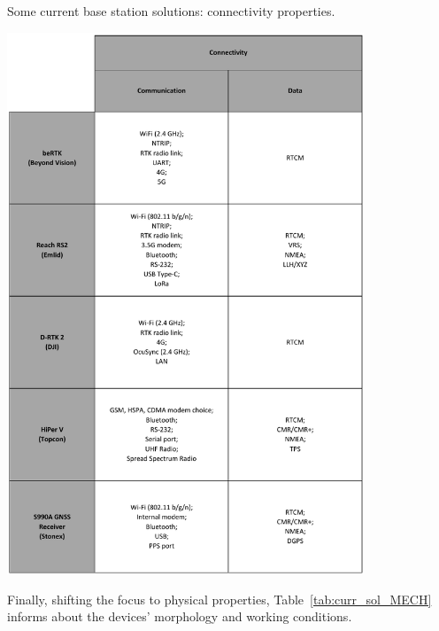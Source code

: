 \begingroup
\begin{table}[h]
    \centering
	\captionsetup{justification=centering}
    \caption{Some current base station solutions: connectivity properties.}
	\includegraphics[width=0.8\textwidth]{Chapters/Figures/curr_solutions/CONNECTIONS_v2.pdf}
	\label{tab:curr_sol_CONNECTIONS}
\end{table}
\endgroup

Finally, shifting the focus to physical properties, Table~\ref{tab:curr_sol_MECH} informs about the devices' morphology and working conditions.

